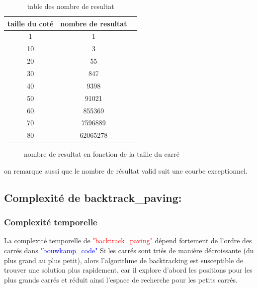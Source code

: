 \documentclass{article}
\begin{document}
\begin{table}[!ht]
    \centering
    \begin{tabular}{|c|c|c|}
    \hline
        taille du coté & nombre de resultat  \\ \hline
        1 & 1 \\ \hline
        10 & 3 \\ \hline
        20 & 55  \\ \hline
        30 & 847  \\ \hline
        40 & 9398  \\ \hline
        50 & 91021 \\ \hline
        60 & 855369  \\ \hline
        70 & 7596889  \\ \hline
        80 & 62065278  \\ \hline
    \end{tabular}
    \caption{table des nombre de resultat }
    \label{tab2}
\end{table}
\vspace{1cm}

\begin{figure}[htbp]
  \centering
  
  \caption{nombre de resultat en fonction de la taille du carré}
  \label{fig3}
\end{figure}

on remarque aussi que le nombre de résultat valid suit une courbe exceptionnel.


\subsection{ Complexité de backtrack\_paving:}
\subsubsection{Complexité temporelle}

La complexité temporelle de \textcolor{red}{"backtrack\_paving"} dépend fortement de l'ordre des carrés dans \textcolor{blue}{"bouwkamp\_code"} Si les carrés sont triés de manière décroissante (du plus grand au plus petit), alors l'algorithme de backtracking est susceptible de trouver une solution plus rapidement, car il explore d'abord les positions pour les plus grands carrés et réduit ainsi l'espace de recherche pour les petits carrés.\newline
\end{document}
